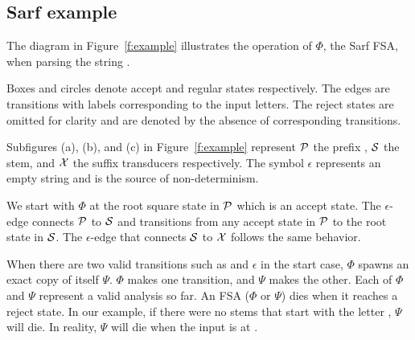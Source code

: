 \documentclass[11pt]{article}
\newcommand{\noTrRL}[1]{\transfalse\RL{#1}\transtrue}
\newcommand{\noTrnoVocRL}[1]{\transfalse\novocalize\noTrRL{#1}\vocalize\transtrue}
\newcommand{\noVocRL}[1]{\transtrue\novocalize\RL{#1}\vocalize}
\begin{document}
\subsection{Sarf example}
\label{sec:example}

\transfalse
\begin{figure}[tb]
\end{figure}


The diagram in Figure~\ref{f:example}
illustrates the operation of $\Phi$, the Sarf FSA,
when parsing the
string \noTrnoVocRL{wsyl`b-h-aa\nospace al--lA`bwn}.

Boxes and circles denote accept and regular
states respectively.
The edges are transitions with labels corresponding to
the input letters.
The reject states are omitted for clarity and are denoted
by the absence of corresponding transitions. 

Subfigures (a), (b), and (c) in Figure~\ref{f:example}
represent ${\cal P}$ the prefix ,
${\cal S}$ the stem, and ${\cal X}$ the suffix
transducers respectively. 
The symbol $\epsilon$ represents an empty string and is 
the source of non-determinism.

We start with $\Phi$ at the root square state in 
${\cal P}$ which is an accept state. 
The $\epsilon$-edge connects ${\cal P}$
to ${\cal S}$ and transitions from any accept state
in ${\cal P}$ to the root state in ${\cal S}$.
The $\epsilon$-edge that connects ${\cal S}$ to ${\cal X}$
follows the same behavior. 

When there are two valid transitions such as \noTrnoVocRL{w} 
and $\epsilon$ in the start case, 
$\Phi$ spawns an exact copy of itself $\Psi$. 
$\Phi$ makes one transition, and $\Psi$ makes the other. 
Each of $\Phi$ and $\Psi$ represent a valid analysis so far. 
An FSA ($\Phi$ or $\Psi$) dies when it reaches a reject state.
In our example, if there were no stems that start 
with the letter \noTrnoVocRL{w}, $\Psi$ will die. 
In reality, $\Psi$ will die when the input 
is at \noTrnoVocRL{wsyl`}. 
\end{document}
